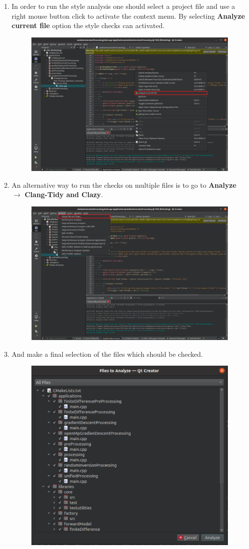 \documentclass[10pt]{article}
\begin{document}
\begin{enumerate}
\item In order to run the style analysis one should select a project file and use a right mouse button click to activate the context menu. By selecting \textbf{Analyze current file} option the style checks can activated.
\begin{figure}[h!]
\centering
\includegraphics[width=0.65 \textwidth]{clang-tidy9.png}
\end{figure}

\newpage
\item An alternative way to run the checks on multiple files is to go to \textbf{Analyze} $\rightarrow$ \textbf{Clang-Tidy and Clazy}.
\begin{figure}[h!]
\centering
\includegraphics[width=0.6 \textwidth]{clang-tidy10.png}
\end{figure}

\item And make a final selection of the files which should be checked.
\begin{figure}[h!]
\centering
\includegraphics[width=0.6 \textwidth]{clang-tidy11.png}
\end{figure}
\end{enumerate}
\end{document}
